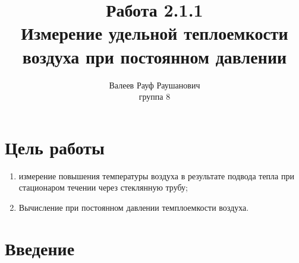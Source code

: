 \documentclass[a4paper, 12pt]{article}%
\author{Валеев Рауф Раушанович \\
группа 8}
\title{\textbf{Работа 2.1.1 \\ 
Измерение удельной теплоемкости воздуха при постоянном давлении}}
\begin{document}
\maketitle

\section*{Цель работы}
\begin{enumerate}
\item измерение повышения температуры воздуха в результате подвода тепла при стационаром течении через стеклянную трубу;
\item Вычисление при постоянном давлении темплоемкости воздуха.
\end{enumerate}
\section*{Введение}
\end{document}
